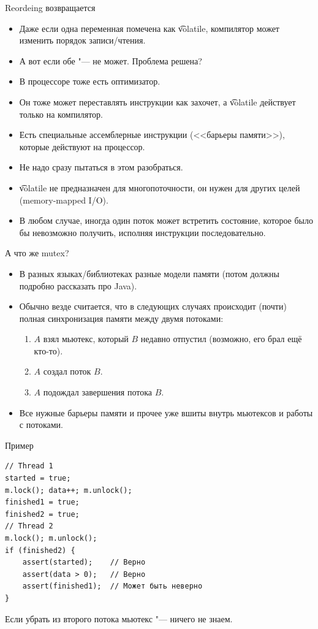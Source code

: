 \begin{frame}{Reordeing возвращается}
	\begin{itemize}
		\item Даже если одна переменная помечена как \t{volatile}, компилятор может изменить порядок записи/чтения.
		\item А вот если обе "--- не может. Проблема решена? \pause
		\item В процессоре тоже есть оптимизатор.
		\item Он тоже может переставлять инструкции как захочет, а \t{volatile} действует только на компилятор.
		\item Есть специальные ассемблерные инструкции (<<барьеры памяти>>), которые действуют на процессор.
		\item Не надо сразу пытаться в этом разобраться.
		\item \t{volatile} не предназначен для многопоточности, он нужен для других целей (memory-mapped I/O).
		\item В любом случае, иногда один поток может встретить состояние, которое было бы невозможно получить, исполняя инструкции последовательно.
	\end{itemize}
\end{frame}

\begin{frame}{А что же mutex?}
	\begin{itemize}
		\item В разных языках/библиотеках разные модели памяти (потом должны подробно рассказать про Java).
		\item Обычно везде считается, что в следующих случаях происходит (почти) полная синхронизация памяти между двумя потоками:
			\begin{enumerate}
				\item $A$ взял мьютекс, который $B$ недавно отпустил (возможно, его брал ещё кто-то).
				\item $A$ создал поток $B$.
				\item $A$ подождал завершения потока $B$.
			\end{enumerate}
		\item Все нужные барьеры памяти и прочее уже вшиты внутрь мьютексов и работы с потоками.
	\end{itemize}
\end{frame}

\begin{frame}[fragile]{Пример}
\begin{verbatim}
// Thread 1
started = true;
m.lock(); data++; m.unlock();
finished1 = true;
finished2 = true;
// Thread 2
m.lock(); m.unlock();
if (finished2) {
    assert(started);    // Верно
    assert(data > 0);   // Верно
    assert(finished1);  // Может быть неверно
}
\end{verbatim}
	Если убрать из второго потока мьютекс "--- ничего не знаем.
\end{frame}

